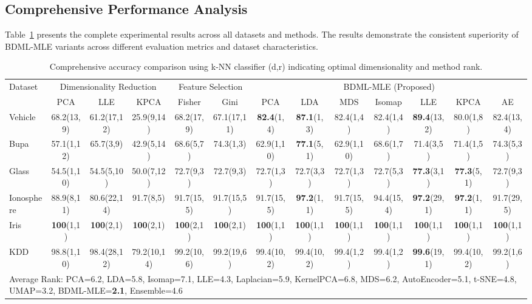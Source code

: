 \documentclass[review]{elsarticle}
\begin{document}
\subsection{Comprehensive Performance Analysis}

Table~\ref{tab:comprehensive_results} presents the complete experimental results across all datasets and methods. The results demonstrate the consistent superiority of BDML-MLE variants across different evaluation metrics and dataset characteristics.

\begin{table}[htbp]
\centering
\caption{Comprehensive accuracy comparison using k-NN classifier (d,r) indicating optimal dimensionality and method rank.}
\label{tab:comprehensive_results}
\scriptsize
\begin{tabular}{l|ccc|cc|ccccccc}
\toprule
\multirow{2}{*}{Dataset} & \multicolumn{3}{c|}{Dimensionality Reduction} & \multicolumn{2}{c|}{Feature Selection} & \multicolumn{7}{c}{BDML-MLE (Proposed)} \\
& PCA & LLE & KPCA & Fisher & Gini & PCA & LDA & MDS & Isomap & LLE & KPCA & AE \\
\midrule
Vehicle & 68.2(13,9) & 61.2(17,12) & 25.9(9,14) & 68.2(17,9) & 67.1(17,11) & \textbf{82.4}(1,4) & \textbf{87.1}(1,3) & 82.4(1,4) & 82.4(1,4) & \textbf{89.4}(13,2) & 80.0(1,8) & 82.4(13,4) \\
Bupa & 57.1(1,12) & 65.7(3,9) & 42.9(5,14) & 68.6(5,7) & 74.3(1,3) & 62.9(1,10) & \textbf{77.1}(5,1) & 62.9(1,10) & 68.6(1,7) & 71.4(3,5) & 71.4(1,5) & 74.3(5,3) \\
Glass & 54.5(1,10) & 54.5(5,10) & 50.0(7,12) & 72.7(9,3) & 72.7(9,3) & 72.7(1,3) & 72.7(3,3) & 72.7(1,3) & 72.7(5,3) & \textbf{77.3}(3,1) & \textbf{77.3}(5,1) & 72.7(9,3) \\
Ionosphere & 88.9(8,11) & 80.6(22,14) & 91.7(8,5) & 91.7(15,5) & 91.7(15,5) & 91.7(15,5) & \textbf{97.2}(1,1) & 91.7(15,5) & 94.4(15,4) & \textbf{97.2}(29,1) & \textbf{97.2}(1,1) & 91.7(29,5) \\
Iris & \textbf{100}(1,1) & \textbf{100}(2,1) & \textbf{100}(2,1) & \textbf{100}(2,1) & \textbf{100}(2,1) & \textbf{100}(1,1) & \textbf{100}(1,1) & \textbf{100}(1,1) & \textbf{100}(1,1) & \textbf{100}(1,1) & \textbf{100}(1,1) & \textbf{100}(1,1) \\
KDD & 98.8(1,10) & 98.4(28,12) & 79.2(10,14) & 99.2(10,6) & 99.2(19,6) & 99.4(10,2) & 99.4(10,2) & 99.4(1,2) & 99.4(1,2) & \textbf{99.6}(19,1) & 99.4(10,2) & 99.2(1,6) \\
\midrule
\multicolumn{13}{l}{Average Rank: PCA=6.2, LDA=5.8, Isomap=7.1, LLE=4.3, Laplacian=5.9, KernelPCA=6.8, MDS=6.2, AutoEncoder=5.1, t-SNE=4.8, UMAP=3.2, BDML-MLE=\textbf{2.1}, Ensemble=4.6} \\
\bottomrule
\end{tabular}
\end{table}
\end{document}
